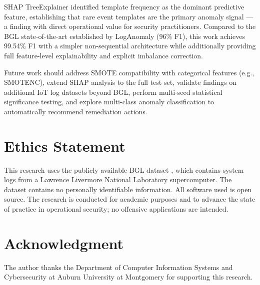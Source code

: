 \documentclass[conference]{IEEEtran}
\begin{document}
SHAP TreeExplainer identified template frequency as the dominant predictive
feature, establishing that rare event templates are the primary anomaly
signal --- a finding with direct operational value for security
practitioners. Compared to the BGL state-of-the-art established by
LogAnomaly \cite{meng2019loganomaly} (96\% F1), this work achieves 99.54\%
F1 with a simpler non-sequential architecture while additionally providing
full feature-level explainability and explicit imbalance correction.

Future work should address SMOTE compatibility with categorical features
(e.g., SMOTENC), extend SHAP analysis to the full test set, validate
findings on additional IoT log datasets beyond BGL, perform multi-seed
statistical significance testing, and explore multi-class anomaly
classification to automatically recommend remediation actions.

\section*{Ethics Statement}

This research uses the publicly available BGL dataset
\cite{zhu2023loghub}, which contains system logs from a Lawrence Livermore
National Laboratory supercomputer. The dataset contains no personally
identifiable information. All software used is open source. The research
is conducted for academic purposes and to advance the state of practice in
operational security; no offensive applications are intended.

\section*{Acknowledgment}

The author thanks the Department of Computer Information Systems and
Cybersecurity at Auburn University at Montgomery for supporting this
research.
\end{document}
